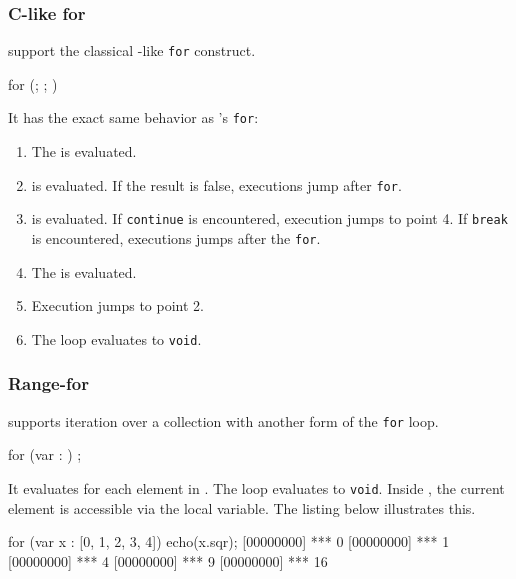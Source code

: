 \subsubsection{C-like for}
\label{sec:lang:for:c}

\us support the classical \C-like \lstinline|for| construct.

\begin{urbiunchecked}
for (; ; )
\end{urbiunchecked}

It has the exact same behavior as \C's \lstinline|for|:

\begin{enumerate}
\item The  is evaluated.
\item {} is evaluated. If the result is false, executions
  jump after \lstinline|for|.
\item {} is evaluated. If \lstinline|continue| is encountered,
  execution jumps to point 4. If \lstinline|break| is encountered,
  executions jumps after the \lstinline|for|.
\item The  is evaluated.
\item Execution jumps to point 2.
\item The loop evaluates to \lstinline|void|.
\end{enumerate}

\subsubsection{Range-for}
\label{sec:lang:for:each}

\us supports iteration over a collection with another form of the
\lstinline|for| loop.

\begin{urbiunchecked}
for (var  : )
   ;
\end{urbiunchecked}

It evaluates  for each element in . The loop
evaluates to \lstinline|void|.  Inside , the current element
is accessible via the  local variable. The listing below
illustrates this.

\begin{urbiscript}
for (var x : [0, 1, 2, 3, 4])
  echo(x.sqr);
[00000000] *** 0
[00000000] *** 1
[00000000] *** 4
[00000000] *** 9
[00000000] *** 16
\end{urbiscript}

